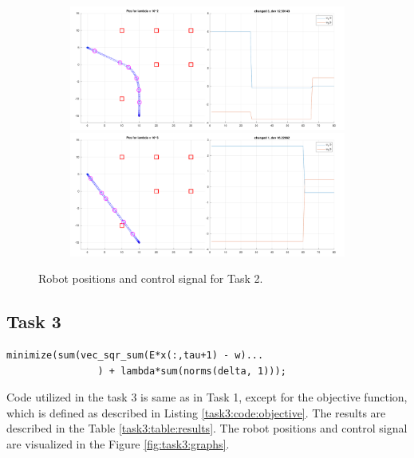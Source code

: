 \begin{figure}[!htb]
\begin{subfigure}
\end{subfigure}
\begin{subfigure}
    \centering
    \includegraphics[width=0.5\linewidth]{part1/figures/task2/2_2.pdf}\hspace{0em}
    \includegraphics[width=0.5\linewidth]{part1/figures/task2/2_3.pdf}
\end{subfigure}
\caption{Robot positions and control signal for Task 2.}
\label{fig:task2:graphs}
\end{figure}

\subsection{Task 3}

\begin{lstlisting}[caption=Objective function used in Task 3., label=task3:code:objective, float=!htb]
minimize(sum(vec_sqr_sum(E*x(:,tau+1) - w)...
                ) + lambda*sum(norms(delta, 1)));
\end{lstlisting}

Code utilized in the task 3 is same as in Task 1, except for the objective function, which is defined as described in Listing \ref{task3:code:objective}. The results are described in the Table \ref{task3:table:results}. The robot positions and control signal are visualized in the Figure \ref{fig:task3:graphs}.

